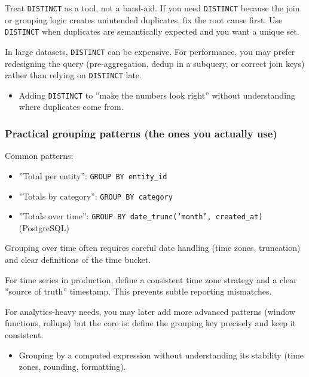 \newpage
\Sx Treat \texttt{DISTINCT} as a tool, not a band-aid. If you need \texttt{DISTINCT} because 
the join or grouping logic creates unintended duplicates, fix the root cause first. Use 
\texttt{DISTINCT} when duplicates are semantically expected and you want a unique set.

\E In large datasets, \texttt{DISTINCT} can be expensive. For performance, you may prefer 
redesigning the query (pre-aggregation, dedup in a subquery, or correct join keys) rather than 
relying on \texttt{DISTINCT} late.

\Pitfall
\begin{itemize}
  \item Adding \texttt{DISTINCT} to ''make the numbers look right'' without understanding 
  where duplicates come from.
\end{itemize}

\subsubsection{Practical grouping patterns (the ones you actually use)}
\J Common patterns:
\begin{itemize}
  \item ''Total per entity'': \texttt{GROUP BY entity\_id}
  \item ''Totals by category'': \texttt{GROUP BY category}
  \item ''Totals over time'': \texttt{GROUP BY date\_trunc('month', created\_at)} (PostgreSQL)
\end{itemize}

\M Grouping over time often requires careful date handling (time zones, truncation) and 
clear definitions of the time bucket.

\Sx For time series in production, define a consistent time zone strategy and a clear 
''source of truth'' timestamp. This prevents subtle reporting mismatches.

\E For analytics-heavy needs, you may later add more advanced patterns (window functions, rollups) 
but the core is: define the grouping key precisely and keep it consistent.

\Pitfall
\begin{itemize}
  \item Grouping by a computed expression without understanding its stability (time zones, 
  rounding, formatting).
\end{itemize}